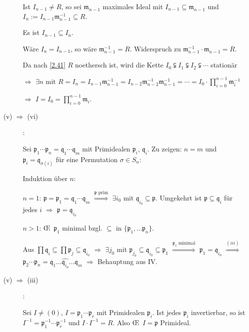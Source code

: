 \documentclass[a4paper, 10pt]{report}
\begin{document}
\begin{Bew}
\begin{description}
Ist $I_{n-1} \neq R$, so sei $\mathfrak{m}_{n-1}$ maximales Ideal mit $I_{n-1} \subseteq \mathfrak{m}_{n-1}$ und $I_n := I_{n-1} \mathfrak{m}_{n-1}^{-1} \subseteq R$.

Es ist $I_{n-1} \subseteq I_n$.

W\"are $I_n = I_{n-1}$, so w\"are $\mathfrak{m}_{n-1}^{-1} = R$. Widerspruch zu $\mathfrak{m}_{n-1}^{-1} \cdot \mathfrak{m}_{n-1} = R$.

Da nach \ref{2.41} $R$ noethersch ist, wird die Kette $I_0 \subsetneqq I_1 \subsetneqq I_2 \subsetneqq \cdots$ station\"ar

$\Rightarrow$ $\exists n$ mit $R = I_n = I_{n-1} \mathfrak{m}_{n-1}^{-1} = I_{n-2} \mathfrak{m}_{n-2}^{-1} \mathfrak{m}_{n-1}^{-1} = \cdots = I_0 \cdot \prod_{i=0}^{n-1} \mathfrak{m}_{i}^{-1}$

$\Rightarrow$ $I = I_0 = \prod_{i=0}^{n-1} \mathfrak{m}_i$.

\item[(v) $\Rightarrow$ (vi)]:

Sei $\mathfrak{p}_1 \cdots \mathfrak{p}_n = \mathfrak{q}_1 \cdots \mathfrak{q}_m$ mit Primidealen $\mathfrak{p}_i$, $\mathfrak{q}_i$. Zu zeigen: $n=m$ und $\mathfrak{p}_i = \mathfrak{q}_{\sigma(i)}$ f\"ur eine Permutation $\sigma \in S_n$:

Induktion \"uber $n$:

$n=1$: $\mathfrak{p} = \mathfrak{p}_1 = \mathfrak{q}_1 \cdots \mathfrak{q}_m$ $\overset{\mathfrak{p}\text{ prim}}{\Rightarrow}$ $\exists i_0$ mit $\mathfrak{q}_{i_0} \subseteq \mathfrak{p}$. Umgekehrt ist $\mathfrak{p} \subseteq \mathfrak{q}_i$ f\"ur jedes $i$ $\Rightarrow$ $\mathfrak{p} = \mathfrak{q}_{i_0}$

$n>1$: \OE\  $\mathfrak{p}_1$ minimal bzgl. $\subseteq$ in $\{ \mathfrak{p}_1,
\ldots \mathfrak{p}_n \}$.

Aus $\prod \mathfrak{q}_i \subseteq \prod \mathfrak{p}_j \subseteq \mathfrak{q}_{i_0}$ $\Rightarrow$ $\exists j_0$ mit $\mathfrak{p}_{j_0} \subseteq \mathfrak{q}_{i_0} \subseteq \mathfrak{p}_1$ $\overset{\mathfrak{p}_1\text{ minimal}}{\Rightarrow}$ $\mathfrak{p}_1 = \mathfrak{q}_{i_0}$ $\overset{(iii)}{\Rightarrow}$ $\mathfrak{p}_2 \cdots \mathfrak{p}_n = \mathfrak{q}_1 \ldots \widehat{\mathfrak{q}_{i_0}} \ldots \mathfrak{q}_m$ $\Rightarrow$ Behauptung aus IV.

\item[(v) $\Rightarrow$ (iii)]:

Sei $I \neq (0)$, $I = \mathfrak{p}_1 \cdots \mathfrak{p}_r$ mit Primidealen
$\mathfrak{p}_i$. Ist jedes $\mathfrak{p}_i$ invertierbar, so ist $I^{-1} =
\mathfrak{p}_1^{-1} \cdots \mathfrak{p}_r^{-1}$ und $I \cdot I^{-1} = R$. Also
\OE\  $I = \mathfrak{p}$ Primideal.


\end{description}
\end{Bew}
\end{document}
